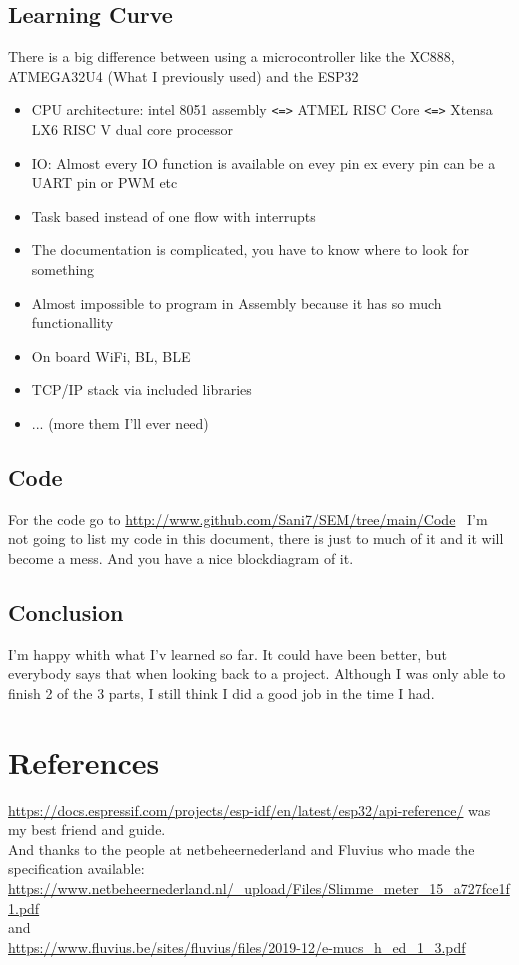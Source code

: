\documentclass[a4paper,twoside, 12pt]{report}
\theoremstyle{break}
\begin{document}
\section{Learning Curve}
There is a big difference between using a microcontroller like the XC888, ATMEGA32U4 (What I previously used) and the ESP32
\begin{itemize}
\item CPU architecture: intel 8051 assembly \verb|<=>| ATMEL RISC Core \verb|<=>|  Xtensa LX6 RISC V dual core processor
\item IO: Almost every IO function is available on evey pin ex every pin can be a UART pin or PWM etc
\item Task based instead of one flow with interrupts
\item The documentation is complicated, you have to know where to look for something
\item Almost impossible to program in Assembly because it has so much functionallity
\item On board WiFi, BL, BLE
\item TCP/IP stack via included libraries
\item ... (more them I'll ever need)
\end{itemize}
\section{Code}
For the code go to \url{http://www.github.com/Sani7/SEM/tree/main/Code} \ I'm not going to list my code in this document, there is just to much of it and it will become a mess. And you have a nice blockdiagram of it.
\section{Conclusion}
I'm happy whith what I'v learned so far. It could have been better, but everybody says that when looking back to a project. Although I was only able to finish 2 of the 3 parts, I still think I did a good job in the time I had.

\chapter{References}
\url{https://docs.espressif.com/projects/esp-idf/en/latest/esp32/api-reference/} was my best friend and guide.\\
And thanks to the people at netbeheernederland and Fluvius who made the specification available:\\
\url{https://www.netbeheernederland.nl/_upload/Files/Slimme_meter_15_a727fce1f1.pdf}\\
and\\ \url{https://www.fluvius.be/sites/fluvius/files/2019-12/e-mucs_h_ed_1_3.pdf}
\vfill
\eject
\end{document}
